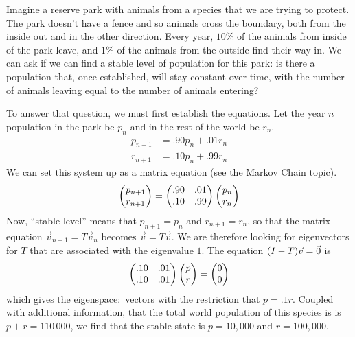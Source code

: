 Imagine a reserve park with animals from a species that we are 
trying to protect.
The park doesn't have a fence and so animals cross the boundary, 
both from the inside out and in the other direction.
Every year, $10\%$ of the animals from inside of the park leave, and  
$1\%$ of the animals from the outside 
find their way in.
We can ask if we can find a stable level of population for this park:
is there a population that, once established, will stay constant over time,
with the number of animals leaving equal to  the number of animals entering?

To answer that question, we must first establish the equations.
Let the year $n$ population in the park be $p_n$ and 
in the rest of the world be $r_n$.
\begin{align*}
  p_{n+1} 
  &=.90p_n+.01r_n    \\
  r_{n+1}
  &=.10p_n+.99r_n 
\end{align*}
We can  set this system up as a matrix equation (see the Markov Chain topic).
\begin{equation*}
  \begin{pmatrix} p_{n+1} \\ r_{n+1} \end{pmatrix}
  =\begin{pmatrix}
    .90  &.01  \\
    .10  &.99
  \end{pmatrix}
  \begin{pmatrix} p_{n} \\ r_{n} \end{pmatrix}
\end{equation*}
Now, ``stable level'' means that $p_{n+1}=p_n$ and $r_{n+1}=r_n$, so that the 
matrix equation $\vec{v}_{n+1}=T\vec{v}_{n}$  becomes $\vec{v}=T\vec{v}$.
We are therefore looking for eigenvectors for $T$ that are associated with
the eigenvalue $1$.
The  equation $(I-T)\vec{v}=\vec{0}$ is
\begin{equation*}
  \begin{pmatrix}
     .10  &.01  \\
     .10  &.01
  \end{pmatrix}
  \begin{pmatrix} p \\ r \end{pmatrix}=
  \begin{pmatrix} 0 \\ 0 \end{pmatrix}
\end{equation*}
which gives the eigenspace:~vectors with the restriction that $p=.1r$.
Coupled with additional information,
that the total world population of this species is 
is $p+r=110\,000$, we find that the stable state is 
$p=10,000$ and $r=100,000$.

